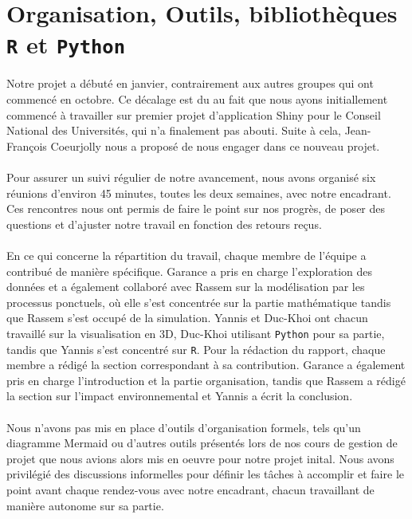 \documentclass[12pt]{article}
\begin{document}
\section{Organisation, Outils, bibliothèques \texttt{R} et \texttt{Python}}
Notre projet a débuté en janvier, contrairement aux autres groupes qui ont commencé en octobre. Ce décalage est du au fait que nous ayons initiallement commencé à travailler sur  premier projet d'application Shiny pour le Conseil National des Universités, qui n'a finalement pas abouti. Suite à cela, Jean-François Coeurjolly nous a proposé de nous engager dans ce nouveau projet.\\
\\
Pour assurer un suivi régulier de notre avancement, nous avons organisé six réunions d'environ 45 minutes, toutes les deux semaines, avec notre encadrant. Ces rencontres nous ont permis de faire le point sur nos progrès, de poser des questions et d'ajuster notre travail en fonction des retours reçus.\\
\\
En ce qui concerne la répartition du travail, chaque membre de l'équipe a contribué de manière spécifique. Garance a pris en charge l'exploration des données et a également collaboré avec Rassem sur la modélisation par les processus ponctuels, où elle s'est concentrée sur la partie mathématique tandis que Rassem s'est occupé de la simulation. Yannis et Duc-Khoi ont chacun travaillé sur la visualisation en 3D, Duc-Khoi utilisant \texttt{Python} pour sa partie, tandis que Yannis s'est concentré sur \texttt{R}. Pour la rédaction du rapport, chaque membre a rédigé la section correspondant à sa contribution. Garance a également pris en charge l'introduction et la partie organisation, tandis que Rassem a rédigé la section sur l'impact environnemental et Yannis a écrit la conclusion.\\
\\
Nous n'avons pas mis en place d'outils d'organisation formels, tels qu'un diagramme Mermaid ou d'autres outils présentés lors de nos cours de gestion de projet que nous avions alors mis en oeuvre pour notre projet inital. Nous avons privilégié des discussions informelles pour définir les tâches à accomplir et faire le point avant chaque rendez-vous avec notre encadrant, chacun travaillant de manière autonome sur sa partie.\\
\\
\end{document}
